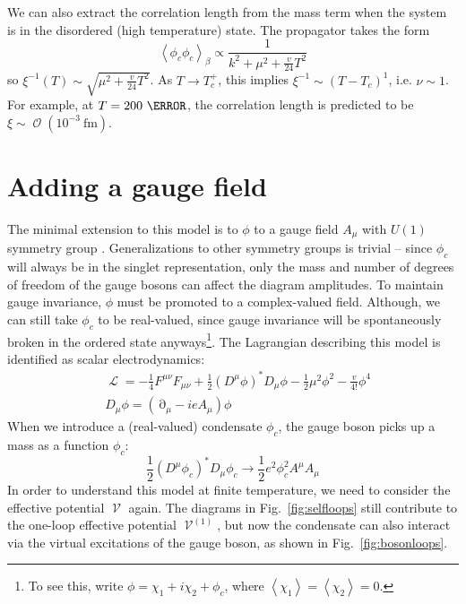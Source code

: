 \documentclass[%
 reprint,
nofootinbib,
 amsmath,amssymb,
 aps,
floatfix,
]{revtex4-1}
\DeclareMathOperator{\Lagr}{\mathcal{L}}
\DeclareMathOperator{\del}{\partial}
\DeclareMathOperator{\BigO}{\mathcal{O}}
\DeclareMathOperator{\V}{\mathcal{V}}
\begin{document}
We can also extract the correlation length from the mass term when the system is in the disordered (high temperature) state.
The propagator takes the form
\begin{equation}
    \left<\phi_c \phi_c\right>_\beta \propto \frac{1}{k^2 + \mu^2+\frac{v}{24}T^2}
\end{equation}
so $\xi^{-1}(T) \sim \sqrt{\mu^2+\frac{v}{24}T^2}$.
As $T \rightarrow T_c^+$, this implies $\xi^{-1} \sim \left(T-T_c\right)^{1}$, i.e. $\nu \sim 1$.
For example, at $T=200~\GeV$, the correlation length is predicted to be $\xi \sim \BigO(10^{-3}~\text{fm})$.

\section{\label{sec:bosons}Adding a gauge field}
The minimal extension to this model is to $\phi$ to a gauge field $A_\mu$ with $U(1)$ symmetry group \cite{sher89}.
Generalizations to other symmetry groups is trivial -- since $\phi_c$ will always be in the singlet representation, only the mass and number of degrees of freedom of the gauge bosons can affect the diagram amplitudes.
To maintain gauge invariance, $\phi$ must be promoted to a complex-valued field.
Although, we can still take $\phi_c$ to be real-valued, since gauge invariance will be spontaneously broken in the ordered state anyways\footnote{To see this, write $\phi = \chi_1 + i\chi_2 + \phi_c$, where $\left<\chi_1\right>=\left<\chi_2\right>=0$.}.
The Lagrangian describing this model is identified as scalar electrodynamics:
\begin{align}
    &\Lagr = -\frac{1}{4}F^{\mu\nu}F_{\mu\nu} + \frac{1}{2}(D^\mu\phi)^*D_\mu\phi - \frac{1}{2}\mu^2\phi^2-\frac{v}{4!}\phi^4 \\
    &D_\mu\phi = (\del_\mu - ieA_\mu)\phi
\end{align}
When we introduce a (real-valued) condensate $\phi_c$, the gauge boson picks up a mass as a function $\phi_c$:
\begin{equation}
    \frac{1}{2}(D^\mu\phi_c)^*D_\mu\phi_c \rightarrow 
    \frac{1}{2}e^2\phi_c^2 A^\mu A_\mu
\end{equation}
In order to understand this model at finite temperature, we need to consider the effective potential $\V$ again.
The diagrams in Fig.~\ref{fig:selfloops} still contribute to the one-loop effective potential $\V^{(1)}$, but now the condensate can also interact via the virtual excitations of the gauge boson, as shown in Fig.~\ref{fig:bosonloops}.
\end{document}
